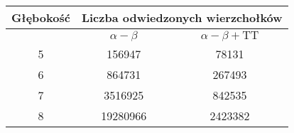 \begin{tabular}{|c|c|c|}
\hline
Głębokość &\multicolumn{2}{|c|}{Liczba odwiedzonych wierzchołków}\\
\hline
& $\alpha - \beta$ &$\alpha - \beta + \text{TT}$ \\ 
\hline
5 & 156947 & 78131 \\
\hline
6 & 864731 & 267493 \\
\hline
7 & 3516925 & 842535 \\
\hline
8 & 19280966 & 2423382 \\
\hline
\end{tabular}
